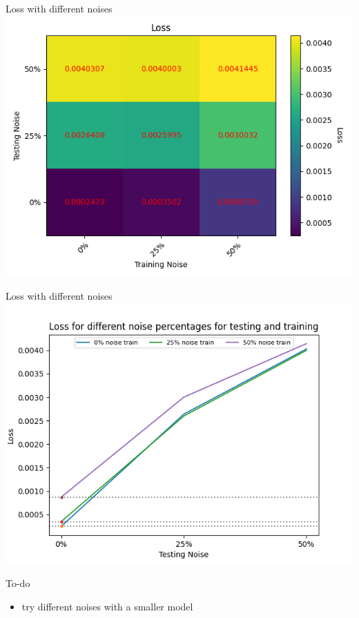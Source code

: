 
\begin{frame}{Loss with different noises}
    \centering
    \includegraphics[width = 0.6\linewidth]{images/Loss.png}
\end{frame}

\begin{frame}{Loss with different noises}
    \centering
    \includegraphics[scale = 0.5]{images/Loss for different noise percentages for testing and training.png}
\end{frame}


\begin{frame}{To-do}
    \begin{itemize}
        \item try different noises with a smaller model
    \end{itemize}
\end{frame}

